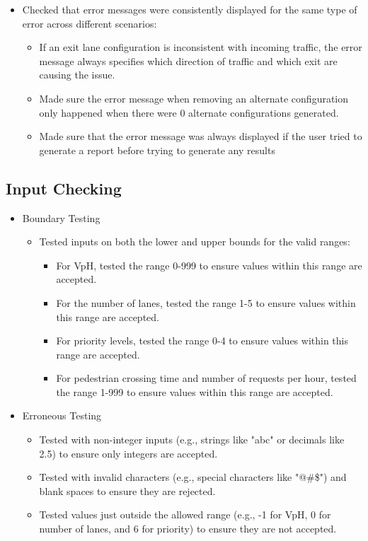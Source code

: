 \documentclass{article}
\begin{document}
\begin{itemize}
\begin{itemize}
            \item Checked that error messages were consistently displayed for the same type of error across different scenarios:
            \begin{itemize}
                \item If an exit lane configuration is inconsistent with incoming traffic, the error message always specifies which direction of traffic and which exit are causing the issue.
                \item Made sure the error message when removing an alternate configuration only happened when there were 0 alternate configurations generated.
                \item Made sure that the error message was always displayed if the user tried to generate a report before trying to generate any results
            \end{itemize}
        \end{itemize}
    \end{itemize}

    \subsection{Input Checking}

    \begin{itemize}
        \item Boundary Testing
        \begin{itemize}
            \item Tested inputs on both the lower and upper bounds for the valid ranges:
            \begin{itemize}
                \item For VpH, tested the range 0-999 to ensure values within this range are accepted.
                \item For the number of lanes, tested the range 1-5 to ensure values within this range are accepted.
                \item For priority levels, tested the range 0-4 to ensure values within this range are accepted.
                \item For pedestrian crossing time and number of requests per hour, tested the range 1-999 to ensure values within this range are accepted.
            \end{itemize}
        \end{itemize}
        \item Erroneous Testing
        \begin{itemize}
            \item Tested with non-integer inputs (e.g., strings like "abc" or decimals like 2.5) to ensure only integers are accepted.
            \item Tested with invalid characters (e.g., special characters like "@\#\$") and blank spaces to ensure they are rejected.
            \item Tested values just outside the allowed range (e.g., -1 for VpH, 0 for number of lanes, and 6 for priority) to ensure they are not accepted.
        \end{itemize}
    \end{itemize}
\end{document}
